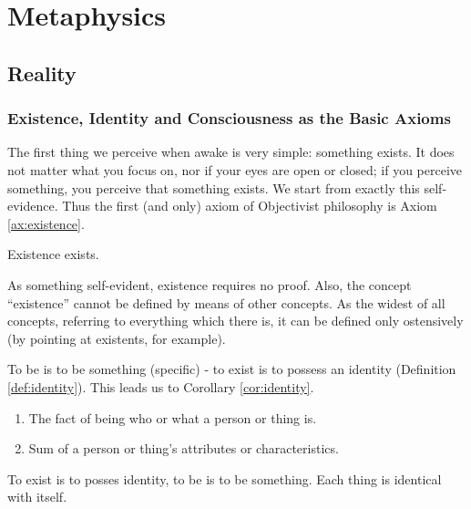 \part{Metaphysics}
\label{part:metaphysics}

\chapter{Reality}

    \section{Existence, Identity and Consciousness as the Basic Axioms}

        The first thing we perceive when awake is very simple: something exists. It does not matter what you focus on, nor if your eyes are open or closed; if you perceive something, you perceive that something exists. We start from exactly this self-evidence. Thus the first (and only) axiom of Objectivist philosophy is Axiom \ref{ax:existence}.
    
            \begin{axiom}[Existence]
            \label{ax:existence}
                Existence exists.
            \end{axiom}
            
        As something self-evident, existence requires no proof. Also, the concept ``existence'' cannot be defined by means of other concepts. As the widest of all concepts, referring to everything which there is, it can be defined only ostensively (by pointing at existents, for example).

        To be is to be something (specific) - to exist is to possess an identity (Definition \ref{def:identity}). This leads us to Corollary \ref{cor:identity}.
            
            \begin{definition}[Identity]
            \label{def:identity}
                \begin{enumerate}
                    \item The fact of being who or what a person or thing is.
                    \item Sum of a person or thing's attributes or characteristics.
                \end{enumerate}
            \end{definition}
        
            \begin{corollary}
            \label{cor:identity}
                To exist is to posses identity, to be is to be something. Each thing is identical with itself.
            \end{corollary}

